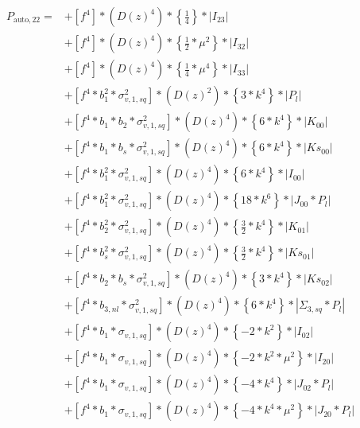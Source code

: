\documentclass{article}
\begin{document}
\begin{equation}
\begin{aligned}  
P_{\mathrm{auto},22}=
&+\left[f^{4}\right]*\left(D(z)^{4}\right)*\left\{\frac{1}{4}\right\}*\left|I_{23}\right| \\
&+\left[f^{4}\right]*\left(D(z)^{4}\right)*\left\{\frac{1}{2}*\mu^{2}\right\}*\left|I_{32}\right| \\
&+\left[f^{4}\right]*\left(D(z)^{4}\right)*\left\{\frac{1}{4}*\mu^{4}\right\}*\left|I_{33}\right| \\
&+\left[f^{4}*b_{1}^{2}*\sigma_{v,1,sq}^{2}\right]*\left(D(z)^{2}\right)*\left\{3*k^{4}\right\}*\left|P_l\right| \\
&+\left[f^{4}*b_{1}*b_{2}*\sigma_{v,1,sq}^{2}\right]*\left(D(z)^{4}\right)*\left\{6*k^{4}\right\}*\left|K_{00}\right| \\
&+\left[f^{4}*b_{1}*b_{s}*\sigma_{v,1,sq}^{2}\right]*\left(D(z)^{4}\right)*\left\{6*k^{4}\right\}*\left|Ks_{00}\right| \\
&+\left[f^{4}*b_{1}^{2}*\sigma_{v,1,sq}^{2}\right]*\left(D(z)^{4}\right)*\left\{6*k^{4}\right\}*\left|I_{00}\right| \\
&+\left[f^{4}*b_{1}^{2}*\sigma_{v,1,sq}^{2}\right]*\left(D(z)^{4}\right)*\left\{18*k^{6}\right\}*\left|J_{00}*P_l\right| \\
&+\left[f^{4}*b_{2}^{2}*\sigma_{v,1,sq}^{2}\right]*\left(D(z)^{4}\right)*\left\{\frac{3}{2}*k^{4}\right\}*\left|K_{01}\right| \\
&+\left[f^{4}*b_{s}^{2}*\sigma_{v,1,sq}^{2}\right]*\left(D(z)^{4}\right)*\left\{\frac{3}{2}*k^{4}\right\}*\left|Ks_{01}\right| \\
&+\left[f^{4}*b_{2}*b_{s}*\sigma_{v,1,sq}^{2}\right]*\left(D(z)^{4}\right)*\left\{3*k^{4}\right\}*\left|Ks_{02}\right| \\
&+\left[f^{4}*b_{3,nl}*\sigma_{v,1,sq}^{2}\right]*\left(D(z)^{4}\right)*\left\{6*k^{4}\right\}*\left|\Sigma_{3,sq}*P_l\right| \\
&+\left[f^{4}*b_{1}*\sigma_{v,1,sq}\right]*\left(D(z)^{4}\right)*\left\{-2*k^{2}\right\}*\left|I_{02}\right| \\
&+\left[f^{4}*b_{1}*\sigma_{v,1,sq}\right]*\left(D(z)^{4}\right)*\left\{-2*k^{2}*\mu^{2}\right\}*\left|I_{20}\right| \\
&+\left[f^{4}*b_{1}*\sigma_{v,1,sq}\right]*\left(D(z)^{4}\right)*\left\{-4*k^{4}\right\}*\left|J_{02}*P_l\right| \\
&+\left[f^{4}*b_{1}*\sigma_{v,1,sq}\right]*\left(D(z)^{4}\right)*\left\{-4*k^{4}*\mu^{2}\right\}*\left|J_{20}*P_l\right| \\

\end{aligned}
\end{equation}
\end{document}
